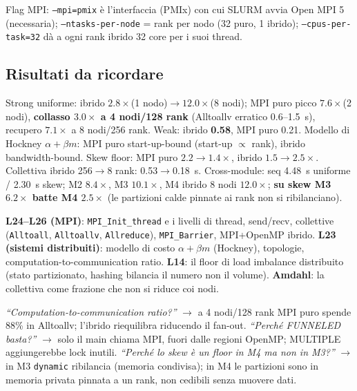 \documentclass[11pt,a4paper]{article}
\begin{document}
Flag MPI: \texttt{--mpi=pmix} è l'interfaccia (PMIx) con cui SLURM avvia Open MPI 5 (necessaria); \texttt{--ntasks-per-node} = rank per nodo (32 puro, 1 ibrido); \texttt{--cpus-per-task=32} dà a ogni rank ibrido 32 core per i suoi thread.

\subsection{Risultati da ricordare}

Strong uniforme: ibrido $2.8\times$(1 nodo)$\to 12.0\times$(8 nodi); MPI puro picco $7.6\times$(2 nodi), \textbf{collasso $3.0\times$ a 4 nodi/128 rank} (Alltoallv erratico 0.6--1.5~s), recupero $7.1\times$ a 8 nodi/256 rank. Weak: ibrido \textbf{0.58}, MPI puro 0.21. Modello di Hockney $\alpha+\beta m$: MPI puro start-up-bound (start-up $\propto$ rank), ibrido bandwidth-bound. Skew floor: MPI puro $2.2\to1.4\times$, ibrido $1.5\to2.5\times$. Collettiva ibrido 256$\to$8 rank: 0.53$\to$0.18~s. Cross-module: seq 4.48~s uniforme / 2.30~s skew; M2 $8.4\times$, M3 $10.1\times$, M4 ibrido 8 nodi $12.0\times$; \textbf{su skew M3 $6.2\times$ batte M4 $2.5\times$} (le partizioni calde pinnate ai rank non si ribilanciano).

\begin{theorybox}
\textbf{L24--L26 (MPI)}: \texttt{MPI\_Init\_thread} e i livelli di thread, send/recv, collettive (\texttt{Alltoall}, \texttt{Alltoallv}, \texttt{Allreduce}), \texttt{MPI\_Barrier}, MPI+OpenMP ibrido. \textbf{L23 (sistemi distribuiti)}: modello di costo $\alpha+\beta m$ (Hockney), topologie, computation-to-communication ratio. \textbf{L14}: il floor di load imbalance distribuito (stato partizionato, hashing bilancia il numero non il volume). \textbf{Amdahl}: la collettiva come frazione che non si riduce coi nodi.
\end{theorybox}

\begin{qbox}[M4]
\emph{``Computation-to-communication ratio?''} $\to$ a 4 nodi/128 rank MPI puro spende 88\% in Alltoallv; l'ibrido riequilibra riducendo il fan-out. \emph{``Perché FUNNELED basta?''} $\to$ solo il main chiama MPI, fuori dalle regioni OpenMP; MULTIPLE aggiungerebbe lock inutili. \emph{``Perché lo skew è un floor in M4 ma non in M3?''} $\to$ in M3 \texttt{dynamic} ribilancia (memoria condivisa); in M4 le partizioni sono in memoria privata pinnata a un rank, non cedibili senza muovere dati.
\end{qbox}
\end{document}
